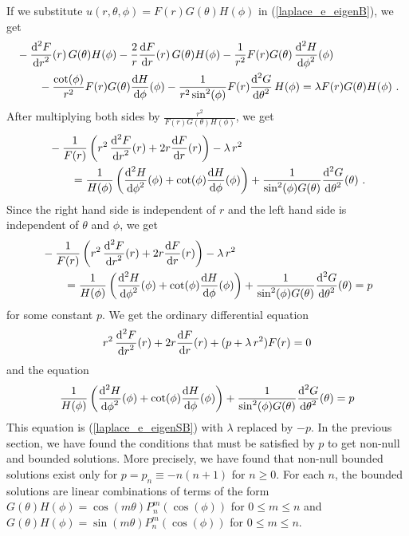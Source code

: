 If we substitute $u(r,\theta, \phi) = F(r)G(\theta)H(\phi)$ in
(\ref{laplace_e_eigenB}), we get 
\begin{align*}
&-\frac{\displaystyle \mathrm{d}^{2}{F}} {\displaystyle \mathrm{d}{r}^{2}}(r)\,G(\theta)H(\phi) - \frac{2}{r} \frac{\mathrm{d}F}{\mathrm{d}{r}}(r) \,
G(\theta)H(\phi) - \frac{1}{r^2}F(r)G(\theta)\,\frac{\displaystyle \mathrm{d}^{2}{H}} {\displaystyle \mathrm{d}{\phi}^{2}}(\phi) \\
&\qquad - \frac{\cot(\phi)}{r^2} F(r)G(\theta)\frac{\mathrm{d}H}{\mathrm{d}{\phi}}(\phi)
- \frac{1}{r^2\sin^2(\phi)} F(r)\frac{\displaystyle \mathrm{d}^{2}{G}} {\displaystyle \mathrm{d}{\theta}^{2}}\,H(\phi)
= \lambda F(r)G(\theta)H(\phi) \ .
\end{align*}
After multiplying both sides by
$\displaystyle \frac{r^2}{F(r)G(\theta)H(\phi)}$, we get
\begin{align*}
&-\frac{1}{F(r)} \left(r^2\,\frac{\displaystyle \mathrm{d}^{2}{F}} {\displaystyle \mathrm{d}{r}^{2}}(r) +
2r \frac{\mathrm{d}F}{\mathrm{d}{r}}(r)\right) - \lambda\,r^2 \\
&\qquad = \frac{1}{H(\phi)}\left( \frac{\displaystyle \mathrm{d}^{2}{H}} {\displaystyle \mathrm{d}{\phi}^{2}}(\phi) + \cot(\phi)
\frac{\mathrm{d}H}{\mathrm{d}{\phi}}(\phi)\right) +
\frac{1}{\sin^2(\phi) G(\theta)} \frac{\displaystyle \mathrm{d}^{2}{G}} {\displaystyle \mathrm{d}{\theta}^{2}}(\theta) \ .
\end{align*}
Since the right hand side is independent of $r$ and the left hand side
is independent of $\theta$ and $\phi$, we get
\begin{align*}
&-\frac{1}{F(r)} \left(r^2\,\frac{\displaystyle \mathrm{d}^{2}{F}} {\displaystyle \mathrm{d}{r}^{2}}(r) +
2r \frac{\mathrm{d}F}{\mathrm{d}{r}}(r)\right) - \lambda\,r^2\\
&\qquad =\frac{1}{H(\phi)}\left( \frac{\displaystyle \mathrm{d}^{2}{H}} {\displaystyle \mathrm{d}{\phi}^{2}}(\phi) +
\cot(\phi) \frac{\mathrm{d}H}{\mathrm{d}{\phi}}(\phi)\right)
+ \frac{1}{\sin^2(\phi)G(\theta)} \frac{\displaystyle \mathrm{d}^{2}{G}} {\displaystyle \mathrm{d}{\theta}^{2}}(\theta) = p
\end{align*}
for some constant $p$.  We get the ordinary differential equation
\begin{equation} \label{laplace_e_eigenB1}
r^2\,\frac{\displaystyle \mathrm{d}^{2}{F}} {\displaystyle \mathrm{d}{r}^{2}}(r)+ 2r \frac{\mathrm{d}F}{\mathrm{d}{r}}(r) + (p+ \lambda\,r^2)F(r) = 0
\end{equation}
and the equation
\[
\frac{1}{H(\phi)}\left( \frac{\displaystyle \mathrm{d}^{2}{H}} {\displaystyle \mathrm{d}{\phi}^{2}}(\phi) +
\cot(\phi) \frac{\mathrm{d}H}{\mathrm{d}{\phi}}(\phi) \right)
+ \frac{1}{\sin^2(\phi)G(\theta)} \frac{\displaystyle \mathrm{d}^{2}{G}} {\displaystyle \mathrm{d}{\theta}^{2}}(\theta) = p
\]
This equation is (\ref{laplace_e_eigenSB}) with $\lambda$ replaced by $-p$.
In the previous section, we have found the conditions that must be
satisfied by $p$ to get non-null and bounded solutions.  More
precisely, we have found that non-null bounded solutions exist only
for $p = p_n \equiv -n(n+1)$ for $n\geq 0$.
For each $n$, the bounded solutions are linear combinations of terms of
the form
$\displaystyle G(\theta) H(\phi) = \cos(m\theta) P_n^m(\cos(\phi))$ for
$0 \leq m \leq n$ and
$\displaystyle G(\theta) H(\phi) = \sin(m\theta) P_n^m(\cos(\phi))$
for $0 \leq m \leq n$.

